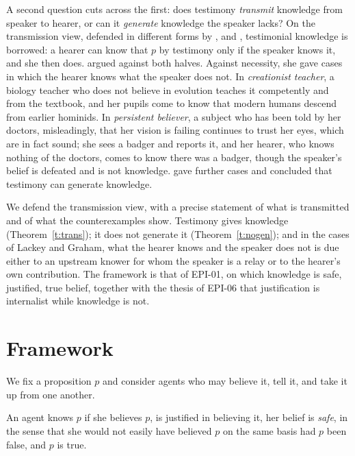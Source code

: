 \documentclass{situationist-preprint}
\begin{document}
A second question cuts across the first: does testimony \emph{transmit} knowledge from speaker to hearer, or can it \emph{generate} knowledge the speaker lacks? On the transmission view, defended in different forms by \citet{Burge1993}, \citet{Audi1997} and \citet{Faulkner2011}, testimonial knowledge is borrowed: a hearer can know that $p$ by testimony only if the speaker knows it, and she then does. \citet{Lackey1999,Lackey2008} argued against both halves. Against necessity, she gave cases in which the hearer knows what the speaker does not. In \emph{creationist teacher}, a biology teacher who does not believe in evolution teaches it competently and from the textbook, and her pupils come to know that modern humans descend from earlier hominids. In \emph{persistent believer}, a subject who has been told by her doctors, misleadingly, that her vision is failing continues to trust her eyes, which are in fact sound; she sees a badger and reports it, and her hearer, who knows nothing of the doctors, comes to know there was a badger, though the speaker's belief is defeated and is not knowledge. \citet{Graham2000,Graham2006} gave further cases and concluded that testimony can generate knowledge.

We defend the transmission view, with a precise statement of what is transmitted and of what the counterexamples show. Testimony gives knowledge (Theorem~\ref{t:trans}); it does not generate it (Theorem~\ref{t:nogen}); and in the cases of Lackey and Graham, what the hearer knows and the speaker does not is due either to an upstream knower for whom the speaker is a relay or to the hearer's own contribution. The framework is that of EPI-01, on which knowledge is safe, justified, true belief, together with the thesis of EPI-06 that justification is internalist while knowledge is not.

\section{Framework}

We fix a proposition $p$ and consider agents who may believe it, tell it, and take it up from one another.

\begin{definition}[Knowledge]\label{d:know}
An agent knows $p$ if she believes $p$, is justified in believing it, her belief is \emph{safe}, in the sense that she would not easily have believed $p$ on the same basis had $p$ been false, and $p$ is true.
\end{definition}
\end{document}
